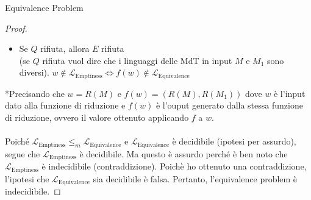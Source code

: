 \documentclass{article}  %
\theoremstyle{definition}
\begin{document}
\begin{theorem}{Equivalence Problem}
\begin{proof}
\begin{enumerate}
\begin{itemize}
				      \item Se $Q$ rifiuta, allora $E$ rifiuta \\
				            (se $Q$ rifiuta vuol dire che i linguaggi delle MdT in input $M$ e $M_1$ sono diversi).
				            $w \notin \mathcal{L}_{\text{Emptiness}} \iff f(w) \notin \mathcal{L}_{\text{Equivalence}}$
			      \end{itemize}
		\end{enumerate}
		*Precisando che $w=R(M)$ e $f(w)=(R(M),R(M_1))$ dove $w$ è l'input dato alla funzione di riduzione e $f(w)$ è l'ouput
		generato dalla stessa funzione di riduzione, ovvero il valore ottenuto applicando $f$ a $w$. \\ \\
		Poiché $\mathcal{L}_{\text{Emptiness}} \leq_m \mathcal{L}_{\text{Equivalence}}$ e $\mathcal{L}_{\text{Equivalence}}$ è decidibile (ipotesi per assurdo), segue
		che $\mathcal{L}_{\text{Emptiness}}$ è decidibile.
		Ma questo è assurdo perché è ben noto che $\mathcal{L}_{\text{Emptiness}}$ è indecidibile (contraddizione). Poichè ho ottenuto una contraddizione, l'ipotesi che
		$\mathcal{L}_{\text{Equivalence}}$ sia decidibile è falsa. Pertanto, l'equivalence problem è indecidibile.
	\end{proof}
\end{theorem}
\end{document}

